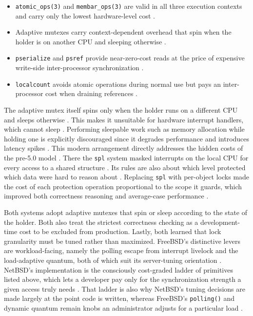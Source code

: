 \begin{itemize}
	\item \texttt{atomic\_ops(3)} and \texttt{membar\_ops(3)} are valid in all three execution contexts and carry only the
	      lowest hardware-level cost \parencite{netbsd_locking}.
	\item Adaptive mutexes carry context-dependent overhead that spin when the holder is on another CPU and sleeping
	      otherwise \parencite{netbsd_locking}.
	\item \texttt{pserialize} and \texttt{psref} provide near-zero-cost reads at the price of expensive write-side
	      inter-processor synchronization \parencite{netbsd_locking}.
	\item \texttt{localcount} avoids atomic operations during normal use but pays an inter-processor cost when draining
	      references \parencite{netbsd_locking}.
\end{itemize}

\noindent
The adaptive mutex itself spins only when the holder runs on a different CPU and sleeps otherwise \parencite{ozaki2015}.
This makes it unsuitable for hardware interrupt handlers, which cannot sleep \parencite{ozaki2015}. Performing sleepable
work such as memory allocation while holding one is explicitly discouraged since it degrades performance and
introduces latency spikes \parencite{ozaki2015}. This modern arrangement directly addresses the hidden costs of the pre-5.0
model \parencite{feyrer2008}. There the \texttt{spl} system masked interrupts on the local CPU for every access to a
shared structure \parencite{feyrer2008}. Its rules are also about which level protected which data were hard to reason
about \parencite{feyrer2008}. Replacing \texttt{spl} with per-object locks made the cost of each protection operation
proportional to the scope it guards, which improved both correctness reasoning and average-case performance \parencite{feyrer2008}.

Both systems adopt adaptive mutexes that spin or sleep according to the state of the holder. Both also treat the strictest correctness
checking as a development-time cost to be excluded from production. Lastly, both learned that lock granularity must be
tuned rather than maximized. FreeBSD's distinctive levers are workload-facing, namely the polling escape from interrupt
livelock and the load-adaptive quantum, both of which suit its server-tuning orientation \parencite{freebsd_polling}.
NetBSD's implementation is the consciously cost-graded ladder of primitives listed above, which lets a developer pay
only for the synchronization strength a given access truly needs \parencite{netbsd_locking}. That ladder is
also why NetBSD's tuning decisions are made largely at the point code is written, whereas FreeBSD's \texttt{polling()}
and dynamic quantum remain knobs an administrator adjusts for a particular load \parencite{freebsd_polling}.

